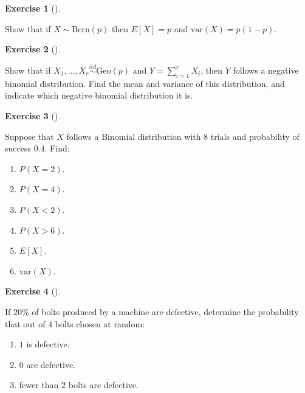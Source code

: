 \documentclass[
  letterpaper,
  DIV=11,
  numbers=noendperiod]{scrreprt}
\providecommand{\tightlist}{%
  \setlength{\itemsep}{0pt}\setlength{\parskip}{0pt}}\usepackage{longtable,booktabs,array}
\theoremstyle{definition}
\newtheorem{exercise}{Exercise}[chapter]
\theoremstyle{definition}
\theoremstyle{definition}
\theoremstyle{remark}
\begin{document}
\begin{exercise}[]\protect\hypertarget{exr-8.2}{}\label{exr-8.2}

Show that if \(X\sim\text{Bern}(p)\) then \(E[X] = p\) and
\(\text{var}(X) = p(1-p)\).

\end{exercise}

\begin{exercise}[]\protect\hypertarget{exr-8.3}{}\label{exr-8.3}

Show that if \(X_1,\dots,X_r\stackrel{iid}{\sim}\text{Geo}(p)\) and
\(Y=\sum_{i=1}^r X_i\), then \(Y\) follows a negative binomial
distribution. Find the mean and variance of this distribution, and
indicate which negative binomial distribution it is.

\end{exercise}

\begin{exercise}[]\protect\hypertarget{exr-8.4}{}\label{exr-8.4}

Suppose that \(X\) follows a Binomial distribution with \(8\) trials and
probability of success \(0.4\). Find:

\begin{enumerate}
\def\labelenumi{\alph{enumi}.}
\tightlist
\item
  \(P(X=2)\).
\item
  \(P(X = 4)\).
\item
  \(P(X < 2)\).
\item
  \(P(X > 6)\).
\item
  \(E[X]\).
\item
  \(\text{var}(X)\).\\
\end{enumerate}

\end{exercise}

\begin{exercise}[]\protect\hypertarget{exr-8.5}{}\label{exr-8.5}

If \(20\%\) of bolts produced by a machine are defective, determine the
probability that out of \(4\) bolts chosen at random:

\begin{enumerate}
\def\labelenumi{\alph{enumi}.}
\tightlist
\item
  \(1\) is defective.
\item
  \(0\) are defective.
\item
  fewer than \(2\) bolts are defective.
\end{enumerate}

\end{exercise}
\end{document}
